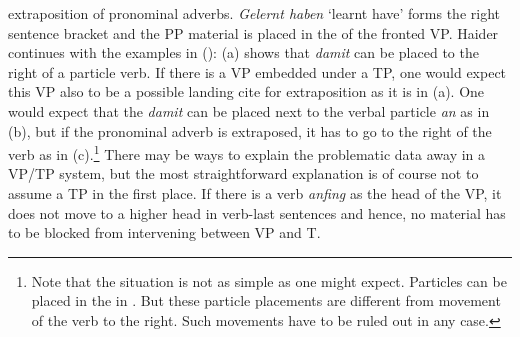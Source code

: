   extraposition of pronominal adverbs. \emph{Gelernt haben} `learnt have' forms the right sentence
  bracket and the PP material is placed in the \nf of the fronted VP.
Haider continues with the examples in ():
\eal
{}
\zl
(a) shows that \emph{damit} can be placed to the right of a particle verb. If there is a VP
embedded under a TP, one would expect this VP also to be a possible landing cite 
for extraposition as it is in (a). One would expect that the \emph{damit} can be placed next
to the verbal particle \emph{an} as in (b), but if the pronominal adverb is extraposed, it
has to go to the right of the verb as in (c).\footnote{
Note that the situation is not as simple as one might expect. Particles can be placed in the
\mf in . But these particle placements are different from movement of the verb to the
right. Such movements have to be ruled out in any case.%
} There may be ways to explain the problematic data away in a
VP/TP system, but the most straightforward explanation is of course not to assume a TP in the first
place. If there is a verb \emph{anfing} as the head of the VP, it does not move to a higher head in
verb-last sentences and hence, no material has to be blocked from intervening between VP and T.


\clearpage



